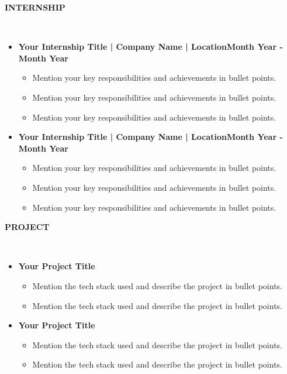\documentclass[11pt,article]{article}
\newcommand{\resheading}[1]{{\small \colorbox{mygrey} { \begin{minipage}{0.99\textwidth}{\textbf{#1 \vphantom{p\^{E}}}}\end{minipage}}}}
\begin{document}
\noindent
\resheading{\textbf{INTERNSHIP} }\\[-0.35cm]
\vspace{-0.4em}
\begin{itemize}
\setlength\itemsep{-0.3em}
\item \textbf{Your Internship Title | Company Name | Location}\hfill \textbf{Month Year - Month Year} 
\vspace{-0.5em}
\begin{itemize}[noitemsep]
    \item Mention your key responsibilities and achievements in bullet points.
    \item Mention your key responsibilities and achievements in bullet points.
    \item Mention your key responsibilities and achievements in bullet points.
\end{itemize}
\item \textbf{Your Internship Title | Company Name | Location}\hfill \textbf{Month Year - Month Year} 
\vspace{-0.5em}
\begin{itemize}[noitemsep]
    \item Mention your key responsibilities and achievements in bullet points.
    \item Mention your key responsibilities and achievements in bullet points.
    \item Mention your key responsibilities and achievements in bullet points.
\end{itemize}
\end{itemize}

\noindent
\resheading{\textbf{PROJECT} }\\[-0.35cm]
\vspace{-0.4em}
\begin{itemize} [noitemsep]
\item \textbf{Your Project Title}
\vspace{-0.25em}
\begin{itemize} [noitemsep]
    \item Mention the tech stack used and describe the project in bullet points.
    \item Mention the tech stack used and describe the project in bullet points.
\end{itemize}
\item \textbf{Your Project Title}
\vspace{-0.25em}
\begin{itemize} [noitemsep]
    \item Mention the tech stack used and describe the project in bullet points.
    \item Mention the tech stack used and describe the project in bullet points.
\end{itemize}
\end{itemize}
\end{document}
